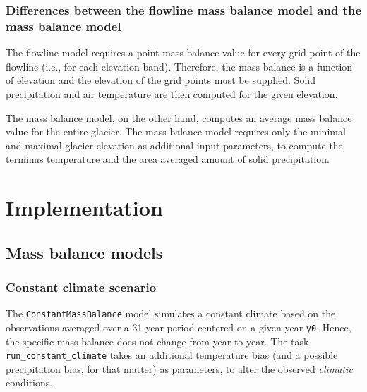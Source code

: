         \subsubsection*{Differences between the flowline mass balance model and the \vas{} mass balance model}

        The flowline model requires a point mass balance value for every grid point of the flowline (i.e., for each elevation band). Therefore, the mass balance is a function of elevation and the elevation of the grid points must be supplied. Solid precipitation and air temperature are then computed for the given elevation.

        The \vas{} mass balance model, on the other hand, computes an average mass balance value for the entire glacier. The mass balance model requires only the minimal and maximal glacier elevation as additional input parameters, to compute the terminus temperature and the area averaged amount of solid precipitation.
    


\section{Implementation} %
\label{sec:implementation}

    \subsection{Mass balance models} %
    \label{sub:mass_balance_models}

        \subsubsection{Constant climate scenario} %
        \label{ssub:constant_climate_scenario}
            The \lstinline`ConstantMassBalance` model simulates a constant climate based on the observations averaged over a 31-year period centered on a given year \lstinline`y0`. Hence, the specific mass balance does not change from year to year. The task \lstinline`run_constant_climate` takes an additional temperature bias (and a possible precipitation bias, for that matter) as parameters, to alter the observed \textit{climatic} conditions.

